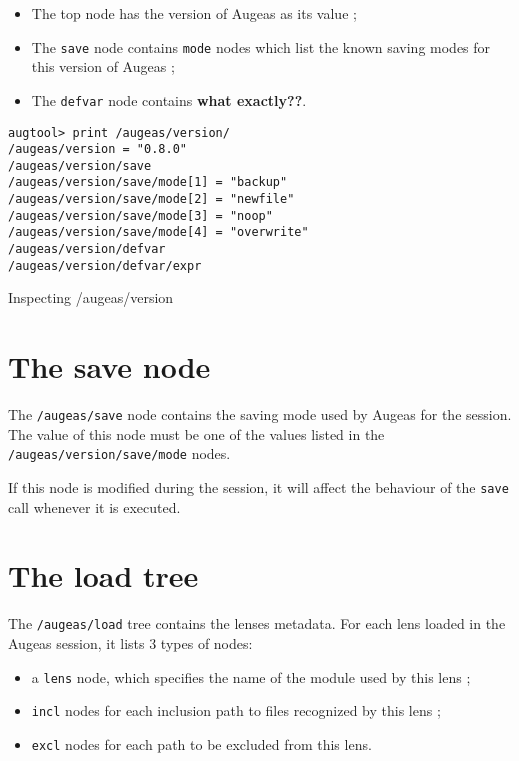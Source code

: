 \begin{itemize}
\item
  The top node has the version of Augeas as its value ;
\item
  The \verb!save! node contains \verb!mode! nodes which list the known saving modes for this version of Augeas ;
\item
  The \verb!defvar! node contains \textbf{what exactly??}.
\end{itemize}


\begin{listing}
  \begin{verbatim}
augtool> print /augeas/version/
/augeas/version = "0.8.0"
/augeas/version/save
/augeas/version/save/mode[1] = "backup"
/augeas/version/save/mode[2] = "newfile"
/augeas/version/save/mode[3] = "noop"
/augeas/version/save/mode[4] = "overwrite"
/augeas/version/defvar
/augeas/version/defvar/expr
  \end{verbatim}
  \caption{Inspecting /augeas/version}
  \label{lst:metadata_version}
\end{listing}


\section{The save node}

\label{sec:save_node} 

The \verb!/augeas/save! node contains the saving mode used by Augeas for the session. The value of this node must be one of the values listed in the \verb!/augeas/version/save/mode! nodes.

If this node is modified during the session, it will affect the behaviour of the \verb!save! call whenever it is executed.

\section{The load tree}


The \verb!/augeas/load! tree contains the lenses metadata. For each lens loaded in the Augeas session, it lists 3 types of nodes:

\begin{itemize}
\item
  a \verb!lens! node, which specifies the name of the module used by this lens ;
\item
  \verb!incl! nodes for each inclusion path to files recognized by this lens ;
\item
  \verb!excl! nodes for each path to be excluded from this lens.
\end{itemize}

